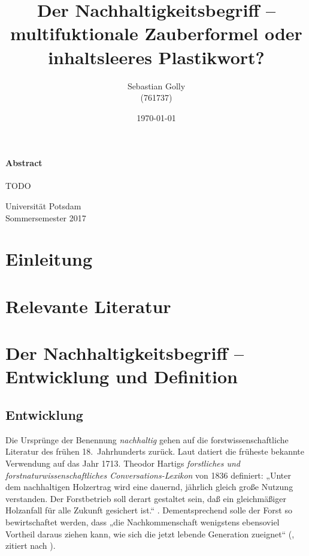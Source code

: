 \documentclass[
    german,
    a4paper,%
    12pt,%
    oneside,%
    toc=bibliography,
    final,
]{scrartcl}
\title{Der Nachhaltigkeitsbegriff – multifuktionale Zauberformel oder inhaltsleeres Plastikwort?}
\subtitle{}
\author{Sebastian Golly\\ {\normalsize (761737)}}
\date{\today}
\begin{document}
\maketitle

\vfill

\paragraph{Abstract}

TODO 
\\[3em]

\vfill

\begin{center}
Universität Potsdam\\[1.5em]
Sommersemester 2017
\end{center}

\thispagestyle{empty}
\newpage


\section{Einleitung}
\label{sec:einleitung}



\section{Relevante Literatur}
\label{sec:rel-literatur}


\section{Der Nachhaltigkeitsbegriff – Entwicklung und Definition}
\label{sec:entwicklung-definition}

\subsection{Entwicklung}
\label{subsec:entwicklung}

Die Ursprünge der Benennung \textit{nachhaltig} gehen auf die forstwissenschaftliche Literatur des frühen 18.~Jahrhunderts zurück. Laut \citet[99]{Zürcher1965} datiert die früheste bekannte Verwendung auf das Jahr 1713. Theodor Hartigs \textit{forstliches und forstnaturwissenschaftliches Conversations-Lexikon} von 1836 definiert: „Unter dem nachhaltigen Holzertrag wird eine dauernd, jährlich gleich große Nutzung verstanden. Der Forstbetrieb soll derart gestaltet sein, daß ein gleichmäßiger Holzanfall für alle Zukunft gesichert ist.“ \citep[nach][100]{Zürcher1965}. Dementsprechend solle der Forst so bewirtschaftet werden, dass „die Nachkommenschaft wenigstens ebensoviel Vortheil daraus ziehen kann, wie sich die jetzt lebende Generation zueignet“ (\citealt[1]{Hartig1804}, zitiert nach \citealt[7]{OhlmeierBrunold2015}).
\end{document}
